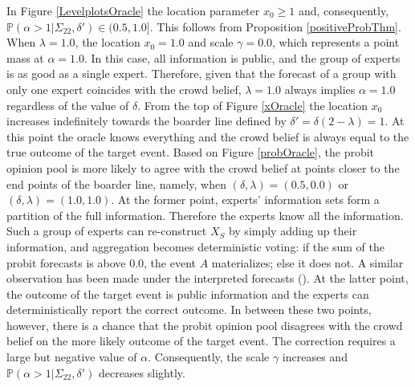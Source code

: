 \documentclass[11pt]{article}
\renewcommand{\P}{\mathbb{P}}
\theoremstyle{definition}
\theoremstyle{definition}
\begin{document}
In Figure \ref{LevelplotsOracle} the location parameter $x_0 \geq 1$ and, consequently, $\P(\alpha > 1 | \Sigma_{22}, \delta') \in (0.5, 1.0]$. This follows from Proposition \ref{positiveProbThm}. When $\lambda = 1.0$, the location $x_0 = 1.0$ and scale $\gamma = 0.0$, which represents a point mass at $\alpha = 1.0$.  In this case, all information is public, and the group of experts is as good as a single expert. Therefore, given that the forecast of a group with only one expert coincides with the crowd belief, $\lambda = 1.0$ always implies $\alpha = 1.0$ regardless of the value of $\delta$. From the top of Figure \ref{xOracle} the location $x_0$ increases indefinitely towards the boarder line defined by $\delta' = \delta(2- \lambda) = 1$. At this point the oracle knows everything and the crowd belief is always equal to the true outcome of the target event. Based on Figure \ref{probOracle}, the probit opinion pool is more likely to agree with the crowd belief at points closer to the end points of the boarder line, namely, when $(\delta, \lambda) = (0.5, 0.0)$ or  $(\delta, \lambda) = (1.0, 1.0)$. At the former point, experts' information sets form a partition of the full information. Therefore the experts know all the information. Such a group of experts can re-construct $X_S$ by simply adding up their information, and aggregation becomes deterministic voting: if the sum of the probit forecasts is above $0.0$, the event $A$ materializes; else it does not. A similar observation has been made under the interpreted forecasts (\citet{hong2009interpreted}). At the latter point, the outcome of the target event is public information and the experts can deterministically report the correct outcome. In between these two points, however, there is a chance that the probit opinion pool disagrees with the crowd belief on the more likely outcome of the target event. The correction requires a large but negative value of $\alpha$. Consequently, the scale $\gamma$ increases and $\P(\alpha > 1 | \Sigma_{22}, \delta')$ decreases slightly. 






\end{document}

